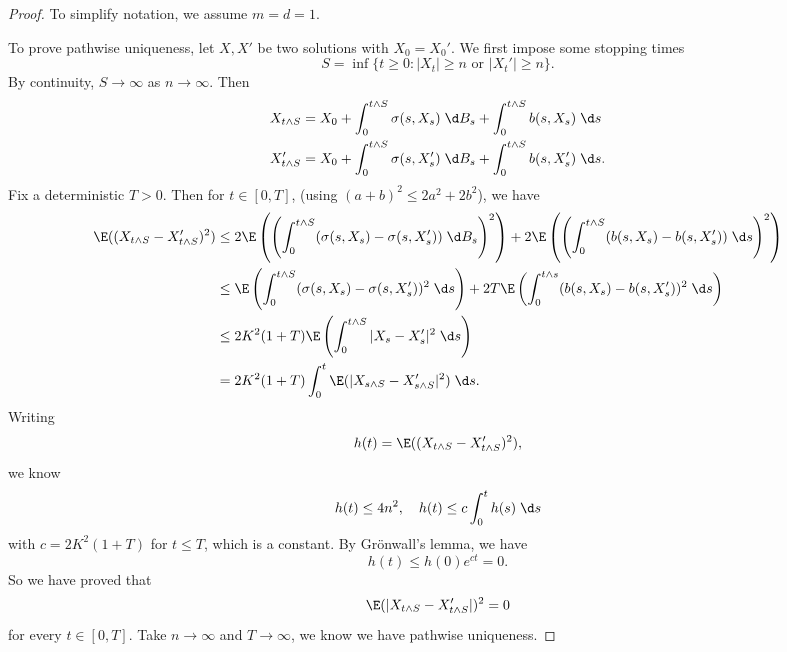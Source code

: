 \documentclass[a4paper]{article}
\begin{document}
\begin{proof}
  To simplify notation, we assume $m = d = 1$.

  To prove pathwise uniqueness, let $X, X'$ be two solutions with $X_0 = X_0'$. We first impose some stopping times
  \[
    S = \inf \{t \geq 0: |X_t| \geq n\text{ or }|X_t'| \geq n\}.
  \]
  By continuity, $S \to \infty$ as $n \to \infty$. Then
  \begin{align*}
    X_{t \wedge S} &= X_0 + \int_0^{t \wedge S} \sigma(s, X_s)\;\d B_s + \int_0^{t \wedge S} b(s, X_s)\;\d s\\
    X'_{t \wedge S} &= X_0 + \int_0^{t \wedge S} \sigma(s, X_s')\;\d B_s + \int_0^{t \wedge S} b(s, X_s')\;\d s.
  \end{align*}
  Fix a deterministic $T > 0$. Then for $t \in [0, T]$, (using $(a + b)^2 \leq 2a^2 + 2b^2$), we have
  \begin{align*}
    \E ((X_{t \wedge S} - X'_{t \wedge S})^2) &\leq 2 \E \left(\left(\int_0^{t \wedge S} (\sigma(s, X_s) - \sigma(s, X_s'))\;\d B_s\right)^2\right) + 2 \E \left(\left(\int_0^{t \wedge S} (b(s, X_s) - b(s, X_s'))\;\d s\right)^2 \right)\\
    &\leq \E \left(\int_0^{t \wedge S} (\sigma(s, X_s) - \sigma(s, X_s'))^2\;\d s\right) + 2T \E \left(\int_0^{t \wedge s} (b(s, X_s) - b(s, X_s'))^2\;\d s\right)\\
    &\leq 2K^2 (1 + T) \E \left(\int_0^{t \wedge S} |X_s - X_s'|^2 \;\d s\right)\\
    &= 2K^2 (1 + T) \int_0^t \E (|X_{s \wedge S} - X'_{s \wedge S}|^2)\;\d s.
  \end{align*}
  Writing
  \[
    h(t) = \E((X_{t \wedge S} - X_{t \wedge S}')^2),
  \]
  we know
  \[
    h(t) \leq 4n^2,\quad h(t) \leq c \int_0^t h(s)\;\d s
  \]
  with $c = 2K^2(1 + T)$ for $t \leq T$, which is a constant. By Gr\"onwall's lemma, we have
  \[
    h(t) \leq h(0) e^{ct} = 0.
  \]
  So we have proved that
  \[
    \E(|X_{t \wedge S} - X_{t \wedge S}'|)^2 = 0
  \]
  for every $t \in [0, T]$. Take $n \to \infty$ and $T \to \infty$, we know we have pathwise uniqueness.


\end{proof}
\end{document}
